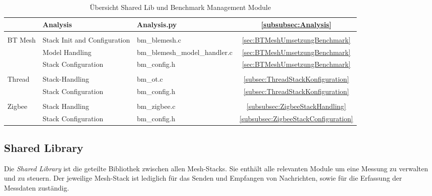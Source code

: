 \begin{table}[h]
\begin{tabular}{|l|l|l|c|}
\cline{2-4}
 & Analysis & Analysis.py & \ref{subsubsec:Analysis} \\ 
\hline
\multicolumn{1}{l}{} & \multicolumn{1}{l}{} & \multicolumn{1}{l}{} & \multicolumn{1}{l}{} \\ 
\hline
\multirow{4}{*}{BT Mesh} & Stack Init and Configuration & bm\_blemesh.c & \ref{sec:BTMeshUmsetzungBenchmark} \\ 
\cline{2-4}
& Model Handling & bm\_blemesh\_model\_handler.c & \ref{sec:BTMeshUmsetzungBenchmark} \\ 
\cline{2-4}
 & Stack Configuration & bm\_config.h & \ref{sec:BTMeshUmsetzungBenchmark} \\ 
\hline
\multicolumn{1}{l}{} & \multicolumn{1}{l}{} & \multicolumn{1}{l}{} & \multicolumn{1}{l}{} \\ 
\hline
\multirow{2}{*}{Thread} & Stack-Handling & bm\_ot.c & \ref{subsec:ThreadStackKonfiguration} \\ 
\cline{2-4}
 & Stack Configuration & bm\_config.h & \ref{subsec:ThreadStackKonfiguration} \\ 
\hline
\multicolumn{1}{l}{} & \multicolumn{1}{l}{} & \multicolumn{1}{l}{} & \multicolumn{1}{l}{} \\ 
\hline
\multirow{2}{*}{Zigbee} & Stack Handling & bm\_zigbee.c & \ref{subsubsec:ZigbeeStackHandling} \\ 
\cline{2-4}
 & Stack Configuration & bm\_config.h & \ref{subsubsec:ZigbeeStackConfiguration} \\
\hline
\end{tabular}
\caption{Übersicht Shared Lib und Benchmark Management Module}
\label{tab:UebersichtSoftware}
\end{table}



\subsection{Shared Library}\label{subsec:SharedLibrary}

Die \textit{Shared Library} ist die geteilte Bibliothek zwischen allen Mesh-Stacks. Sie enthält alle relevanten Module um eine Messung zu verwalten und zu steuern. Der jeweilige Mesh-Stack ist lediglich für das Senden und Empfangen von Nachrichten, sowie für die Erfassung der Messdaten zuständig. 


